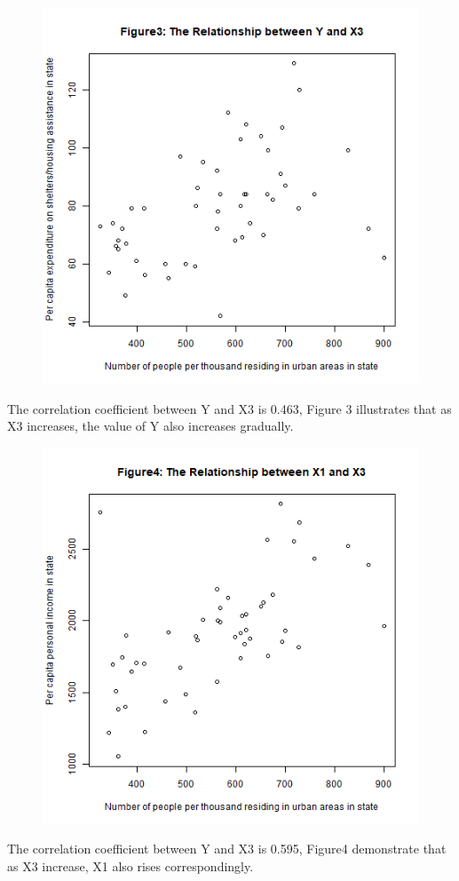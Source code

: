 \documentclass[12pt,letterpaper]{article}
\begin{document}
\begin{itemize}
\begin{figure}[H]
	\centering
	\includegraphics[width=.55\textwidth]{Y~X3.png}
\end{figure}
\noindent The correlation coefficient between Y and X3 is 0.463, Figure 3 illustrates that as X3 increases, the value of Y also increases gradually. \\

  

\begin{figure}[H]
	\centering
	\includegraphics[width=.55\textwidth]{X1~X3.png}
\end{figure}
\noindent The correlation coefficient between Y and X3 is 0.595, Figure4 demonstrate that as X3 increase, X1 also rises correspondingly. \\


\end{itemize}
\end{document}
